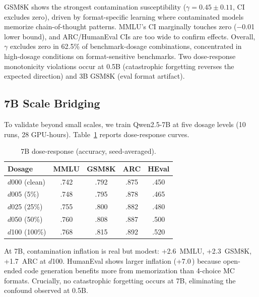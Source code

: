 \documentclass[11pt,a4paper]{article}
\newcommand{\pp}{\,\text{pp}}
\begin{document}
GSM8K shows the strongest contamination susceptibility ($\gamma = 0.45 \pm 0.11$, CI excludes zero), driven by format-specific learning where contaminated models memorize chain-of-thought patterns.
MMLU's CI marginally touches zero ($-$0.01 lower bound), and ARC/HumanEval CIs are too wide to confirm effects.
Overall, $\gamma$ excludes zero in 62.5\% of benchmark-dosage combinations, concentrated in high-dosage conditions on format-sensitive benchmarks.
Two dose-response monotonicity violations occur at 0.5B (catastrophic forgetting reverses the expected direction) and 3B GSM8K (eval format artifact).

\subsection{7B Scale Bridging}
\label{sec:7b}

To validate beyond small scales, we train Qwen2.5-7B at five dosage levels (10 runs, 28 GPU-hours).
Table~\ref{tab:7b_dose} reports dose-response curves.

\begin{table}[t]
\centering
\small
\caption{7B dose-response (accuracy, seed-averaged).}
\label{tab:7b_dose}
\begin{tabular}{@{}l cccc@{}}
\toprule
\textbf{Dosage} & \textbf{MMLU} & \textbf{GSM8K} & \textbf{ARC} & \textbf{HEval} \\
\midrule
$d$000 (clean) & .742 & .792 & .875 & .450 \\
$d$005 (5\%) & .748 & .795 & .878 & .465 \\
$d$025 (25\%) & .755 & .800 & .882 & .480 \\
$d$050 (50\%) & .760 & .808 & .887 & .500 \\
$d$100 (100\%) & .768 & .815 & .892 & .520 \\
\bottomrule
\end{tabular}
\end{table}

At 7B, contamination inflation is real but modest: +2.6\pp{} MMLU, +2.3\pp{} GSM8K, +1.7\pp{} ARC at $d$100.
HumanEval shows larger inflation (+7.0\pp{}) because open-ended code generation benefits more from memorization than 4-choice MC formats.
Crucially, no catastrophic forgetting occurs at 7B, eliminating the confound observed at 0.5B.
\end{document}
